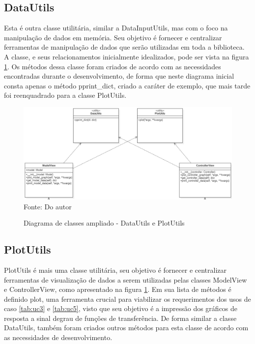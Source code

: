 \subsection{DataUtils}

Esta é outra classe utilitária, similar a DataInputUtils, mas com o foco na manipulação de dados em memória.
Seu objetivo é fornecer e centralizar ferramentas de manipulação de dados que serão utilizadas em toda a biblioteca.
A classe, e seus relacionamentos inicialmente idealizados, pode ser vista na figura \ref{fig:class_diag_dupu}.
Os métodos dessa classe foram criados de acordo com as necessidades encontradas durante o desenvolvimento, de forma que
neste diagrama inicial consta apenas o método pprint\_dict, criado a caráter de exemplo, que mais tarde foi reenquadrado
para a classe PlotUtils.

\begin{figure}[H]
    \centering
    \caption{Diagrama de classes ampliado - DataUtils e PlotUtils}
    \includegraphics[scale=0.6]{figuras/class_diag_dupu}
    \label{fig:class_diag_dupu}
    \\
    \vspace{0cm}\hspace{0cm}\small{Fonte: Do autor}
\end{figure}

\subsection{PlotUtils}

PlotUtils é mais uma classe utilitária, seu objetivo é fornecer e centralizar ferramentas de visualização de dados
a serem utilizadas pelas classes ModelView e ControllerView, como apresentado na figura \ref{fig:class_diag_dupu}.
Em sua lista de métodos é definido plot, uma ferramenta crucial para viabilizar os requerimentos dos usos de caso
\ref{tab:uc3} e \ref{tab:uc5}, visto que seu objetivo é a impressão dos gráficos de resposta a sinal degrau de funções de
transferência.
De forma similar a classe DataUtils, também foram criados outros métodos para esta classe de acordo com as necessidades de
desenvolvimento.


